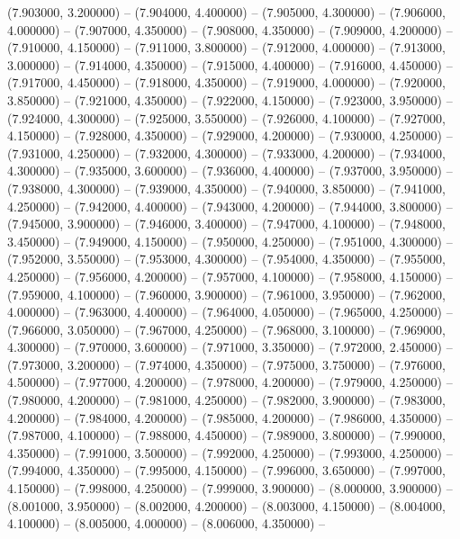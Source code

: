 (7.903000, 3.200000) -- 
(7.904000, 4.400000) -- 
(7.905000, 4.300000) -- 
(7.906000, 4.000000) -- 
(7.907000, 4.350000) -- 
(7.908000, 4.350000) -- 
(7.909000, 4.200000) -- 
(7.910000, 4.150000) -- 
(7.911000, 3.800000) -- 
(7.912000, 4.000000) -- 
(7.913000, 3.000000) -- 
(7.914000, 4.350000) -- 
(7.915000, 4.400000) -- 
(7.916000, 4.450000) -- 
(7.917000, 4.450000) -- 
(7.918000, 4.350000) -- 
(7.919000, 4.000000) -- 
(7.920000, 3.850000) -- 
(7.921000, 4.350000) -- 
(7.922000, 4.150000) -- 
(7.923000, 3.950000) -- 
(7.924000, 4.300000) -- 
(7.925000, 3.550000) -- 
(7.926000, 4.100000) -- 
(7.927000, 4.150000) -- 
(7.928000, 4.350000) -- 
(7.929000, 4.200000) -- 
(7.930000, 4.250000) -- 
(7.931000, 4.250000) -- 
(7.932000, 4.300000) -- 
(7.933000, 4.200000) -- 
(7.934000, 4.300000) -- 
(7.935000, 3.600000) -- 
(7.936000, 4.400000) -- 
(7.937000, 3.950000) -- 
(7.938000, 4.300000) -- 
(7.939000, 4.350000) -- 
(7.940000, 3.850000) -- 
(7.941000, 4.250000) -- 
(7.942000, 4.400000) -- 
(7.943000, 4.200000) -- 
(7.944000, 3.800000) -- 
(7.945000, 3.900000) -- 
(7.946000, 3.400000) -- 
(7.947000, 4.100000) -- 
(7.948000, 3.450000) -- 
(7.949000, 4.150000) -- 
(7.950000, 4.250000) -- 
(7.951000, 4.300000) -- 
(7.952000, 3.550000) -- 
(7.953000, 4.300000) -- 
(7.954000, 4.350000) -- 
(7.955000, 4.250000) -- 
(7.956000, 4.200000) -- 
(7.957000, 4.100000) -- 
(7.958000, 4.150000) -- 
(7.959000, 4.100000) -- 
(7.960000, 3.900000) -- 
(7.961000, 3.950000) -- 
(7.962000, 4.000000) -- 
(7.963000, 4.400000) -- 
(7.964000, 4.050000) -- 
(7.965000, 4.250000) -- 
(7.966000, 3.050000) -- 
(7.967000, 4.250000) -- 
(7.968000, 3.100000) -- 
(7.969000, 4.300000) -- 
(7.970000, 3.600000) -- 
(7.971000, 3.350000) -- 
(7.972000, 2.450000) -- 
(7.973000, 3.200000) -- 
(7.974000, 4.350000) -- 
(7.975000, 3.750000) -- 
(7.976000, 4.500000) -- 
(7.977000, 4.200000) -- 
(7.978000, 4.200000) -- 
(7.979000, 4.250000) -- 
(7.980000, 4.200000) -- 
(7.981000, 4.250000) -- 
(7.982000, 3.900000) -- 
(7.983000, 4.200000) -- 
(7.984000, 4.200000) -- 
(7.985000, 4.200000) -- 
(7.986000, 4.350000) -- 
(7.987000, 4.100000) -- 
(7.988000, 4.450000) -- 
(7.989000, 3.800000) -- 
(7.990000, 4.350000) -- 
(7.991000, 3.500000) -- 
(7.992000, 4.250000) -- 
(7.993000, 4.250000) -- 
(7.994000, 4.350000) -- 
(7.995000, 4.150000) -- 
(7.996000, 3.650000) -- 
(7.997000, 4.150000) -- 
(7.998000, 4.250000) -- 
(7.999000, 3.900000) -- 
(8.000000, 3.900000) -- 
(8.001000, 3.950000) -- 
(8.002000, 4.200000) -- 
(8.003000, 4.150000) -- 
(8.004000, 4.100000) -- 
(8.005000, 4.000000) -- 
(8.006000, 4.350000) -- 
